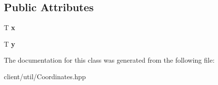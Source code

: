 \subsection*{Public Attributes}
\begin{DoxyCompactItemize}
\item 
\hypertarget{classutil_1_1_coordinates_a1052fd5dd7584f76f76d37f3d8eefb95}{T {\bfseries x}}\label{classutil_1_1_coordinates_a1052fd5dd7584f76f76d37f3d8eefb95}

\item 
\hypertarget{classutil_1_1_coordinates_aa8b56c87c71e25e6282dfaeee3516cb7}{T {\bfseries y}}\label{classutil_1_1_coordinates_aa8b56c87c71e25e6282dfaeee3516cb7}

\end{DoxyCompactItemize}


The documentation for this class was generated from the following file\-:\begin{DoxyCompactItemize}
\item 
client/util/Coordinates.\-hpp\end{DoxyCompactItemize}
